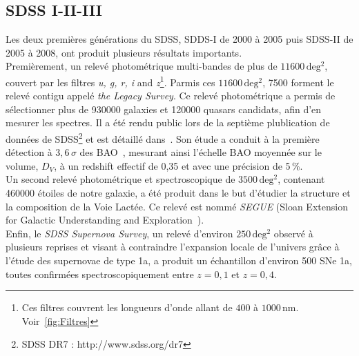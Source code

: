 \documentclass[11pt, twoside, a4paper, openright]{report}
\begin{document}
\subsection{SDSS I-II-III}
Les deux premières générations du SDSS, SDDS-I de 2000 à 2005 puis SDSS-II de 2005 à 2008, ont produit plusieurs résultats importants.\\
Premièrement, un relevé photométrique multi-bandes de plus de $\num{11600}\,\mathrm{deg^{2}}$, couvert par les filtres \emph{u, g, r, i} and \emph{z}\footnote{Ces filtres couvrent les longueurs d'onde allant de $400$ à $1000\,\mathrm{nm}$. Voir~\ref{fig:Filtres}}. Parmis ces $\num{11600}\,\mathrm{deg^{2}}$, \num{7500} forment le relevé contigu appelé \emph{the Legacy Survey}. Ce relevé photométrique a permis de sélectionner plus de \num{930000} galaxies et \num{120000} quasars candidats, afin d'en mesurer les spectres. Il a été rendu public lors de la septième plublication de données de SDSS\footnote{SDSS DR7 : http://www.sdss.org/dr7} et est détaillé dans~\cite{Abazajian2008}. Son étude a conduit à la première détection à $3,6\,\sigma$ des BAO~\cite{Eisenstein2005}, mesurant ainsi l'échelle BAO moyennée sur le volume, $D_V$, à un redshift effectif de 0,35 et avec une précision de 5\,\%. \\
Un second relevé photométrique et spectroscopique de $\num{3500}\,\mathrm{deg^{2}}$, contenant \num{460000} étoiles de notre galaxie, a été produit dans le but d'étudier la structure et la composition de la Voie Lactée. Ce relevé est nommé \emph{SEGUE} (Sloan Extension for Galactic Understanding and Exploration~\cite{Collaboration2009}).\\
Enfin, le \emph{SDSS Supernova Survey}, un relevé d'environ $\num{250}\,\mathrm{deg^{2}}$ observé à plusieurs reprises et visant à contraindre l'expansion locale de l'univers gr\^ace à l'étude des supernovae de type 1a, a produit un échantillon d'environ 500 SNe 1a, toutes confirmées spectroscopiquement entre $z=0,1$ et $z=0,4$.
\end{document}
